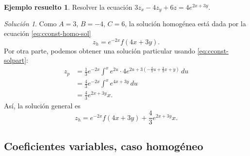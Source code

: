\documentclass[11pt,letterpaper,draft]{report}
\theoremstyle{plain}
\theoremstyle{definition}
\newtheorem{solved}[theorem]{Ejemplo resuelto}
\theoremstyle{remark}
\newtheorem*{solution}{Solución}
\newcommand\<{\langle}
\renewcommand\>{\rangle}
\begin{document}
\begin{solved}
  Resolver la ecuación $3z_x - 4z_y + 6z = 4e^{2x+3y}$.
  \begin{solution}
    Como \(A=3\), \(B=-4\), \(C=6\), la solución homogénea está dada
    por la ecuación \eqref{eq:cconst-homo-sol} 
    \begin{equation}
      z_h = e^{-2x}f(4x+3y)
    .\end{equation}
    Por otra parte, podemos obtener una solución particular usando
    \eqref{eq:cconst-solpart}:
    \begin{align}
      z_p
      &= \frac{1}{3}e^{-2x}
      \int^x
        e^{2u}
        \cdot 4e^{2u+3(-\tfrac{4}{3}u+\tfrac{4}{3}x+y)}
      \, du \\
      &= \frac{4}{3}e^{-2x}
      \int^x e^{4x+3y} \, du \\
      &= \frac{4}{3}e^{2x+3y}x
    .\end{align}
    Así, la solución general es
    \begin{equation}
      z_h = e^{-2x}f(4x+3y) + \frac{4}{3}e^{2x+3y}x
    .\end{equation}
  \end{solution}
\end{solved}

\subsection{Coeficientes variables, caso homogéneo}
\label{ssec:cvar-homo}
\end{document}
